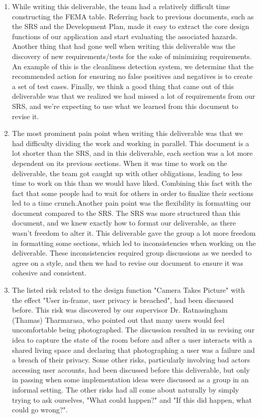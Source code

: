 \documentclass{article}
\begin{document}
\begin{enumerate}
    \item While writing this deliverable, the team had a relatively difficult time constructing the FEMA table. Referring back to previous documents, such as the SRS and the Development Plan, made it easy to extract the core design functions of our application and start evaluating the associated hazards. Another thing that had gone well when writing this deliverable was the discovery of new requirements/tests for the sake of minimizing requirements. An example of this is the cleanliness detection system, we determine that the recommended action for ensuring no false positives and negatives is to create a set of test cases. Finally, we think a good thing that came out of this deliverable was that we realized we had missed a lot of requirements from our SRS, and we're expecting to use what we learned from this document to revise it.
    
    \item The most prominent pain point when writing this deliverable was that we had difficulty dividing the work and working in parallel. This document is a lot shorter than the SRS, and in this deliverable, each section was a lot more dependent on its previous sections. When it was time to work on the deliverable, the team got caught up with other obligations, leading to less time to work on this than we would have liked. Combining this fact with the fact that some people had to wait for others in order to finalize their sections led to a time crunch.\newline Another pain point was the flexibility in formatting our document compared to the SRS. The SRS was more structured than this document, and we knew exactly how to format our deliverable, as there wasn't freedom to alter it. This deliverable gave the group a lot more freedom in formatting some sections, which led to inconsistencies when working on the deliverable. These inconsistencies required group discussions as we needed to agree on a style, and then we had to revise our document to ensure it was cohesive and consistent. 
    
    \item The listed risk related to the design function "Camera Takes Picture" with the effect "User in-frame, user privacy is breached", had been discussed before. This risk was discovered by our supervisor Dr. Ratnasingham (Thamas) Tharmarasa, who pointed out that many users would feel uncomfortable being photographed. The discussion resulted in us revising our idea to capture the state of the room before and after a user interacts with a shared living space and declaring that photographing a user was a failure and a breach of their privacy. Some other risks, particularly involving bad actors accessing user accounts, had been discussed before this deliverable, but only in passing when some implementation ideas were discussed as a group in an informal setting. The other risks had all come about naturally by simply trying to ask ourselves, "What could happen?" and "If this did happen, what could go wrong?".
    

\end{enumerate}
\end{document}
